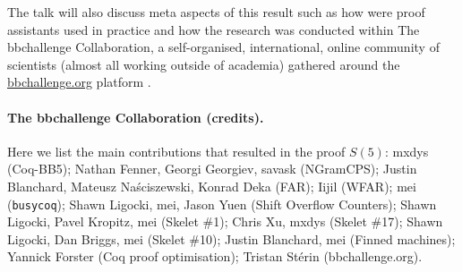 \documentclass{easychair}
\newcommand{\CoqBB}{Coq-BB5\xspace}
\theoremstyle{definition} %
\numberwithin{equation}{section}
\theoremstyle{definition} %
\begin{document}
The talk will also discuss meta aspects of this result such as how were proof assistants used in practice and how the research was conducted within The bbchallenge Collaboration, a self-organised, international, online community of scientists (almost all working outside of academia) gathered around the \url{bbchallenge.org} platform \cite{sterin_2022_14955828}.

\newpage




\newpage
\paragraph{The bbchallenge Collaboration (credits).} Here we list the main contributions that resulted in the proof $S(5)$: mxdys (\CoqBB); Nathan Fenner, Georgi Georgiev, savask (NGramCPS); Justin Blanchard, Mateusz Naściszewski, Konrad Deka (FAR); Iijil (WFAR); mei (\texttt{busycoq}); Shawn Ligocki, mei, Jason Yuen (Shift Overflow Counters); Shawn Ligocki, Pavel Kropitz, mei (Skelet \#1); Chris Xu, mxdys (Skelet \#17); Shawn Ligocki, Dan Briggs, mei (Skelet \#10); Justin Blanchard, mei (Finned machines); Yannick Forster (Coq proof optimisation); Tristan Stérin (bbchallenge.org).

\end{document}
